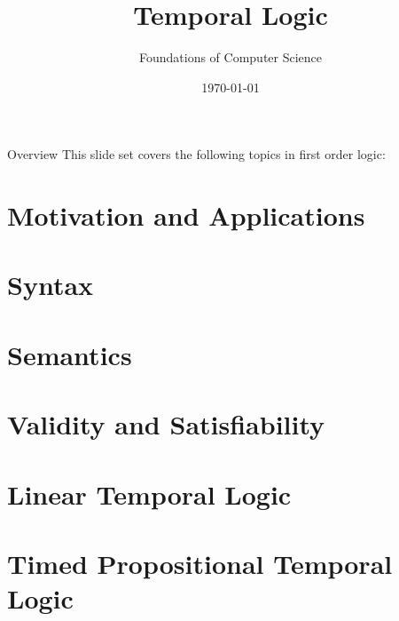 \documentclass[style=sailor,size=12pt]{powerdot}
\title{Temporal Logic}
\author{Foundations of Computer Science}
\date{\today}
\begin{document}
\maketitle

\begin{slide}[toc=,bm=]{Overview}
This slide set covers the following topics in first order logic:

\vspace{5mm}
\tableofcontents[content=sections]
\end{slide}

\section[slide=true]{Motivation and Applications}


\section[slide=true]{Syntax}


\section[slide=true]{Semantics}


\section[slide=true]{Validity and Satisfiability}


\section[slide=true]{Linear Temporal Logic}


\section[slide=true]{Timed Propositional Temporal Logic}

\end{document}
